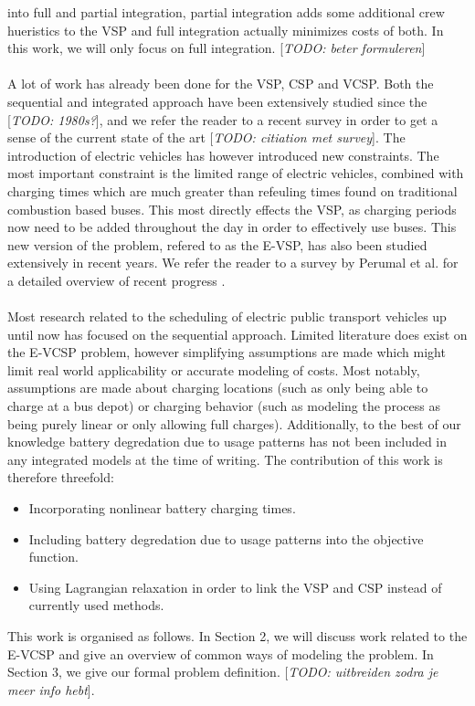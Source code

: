 \documentclass[]{article}
\newcommand{\todo}[1]{{\color{red}[\textit{TODO: #1}]}}
\begin{document}
into full and partial integration, partial integration adds some additional
crew hueristics to the VSP and full integration actually minimizes costs of
both. In this work, we will only focus on full integration. \todo{beter
  formuleren} \\\\ A lot of work has already been done for the VSP, CSP and VCSP.
Both the sequential and integrated approach have been extensively studied since
the \todo{1980s?}, and we refer the reader to a recent survey in order to get a
sense of the current state of the art \todo{citiation met survey}. The
introduction of electric vehicles has however introduced new constraints. The
most important constraint is the limited range of electric vehicles, combined
with charging times which are much greater than refeuling times found on
traditional combustion based buses. This most directly effects the VSP, as
charging periods now need to be added throughout the day in order to
effectively use buses. This new version of the problem, refered to as the
E-VSP, has also been studied extensively in recent years. We refer the reader
to a survey by Perumal et al. for a detailed overview of recent progress
\cite{Perumal2022LitRev}. \\\\ Most research related to the scheduling of
electric public transport vehicles up until now has focused on the sequential
approach. Limited literature does exist on the E-VCSP problem, however
simplifying assumptions are made which might limit real world applicability or
accurate modeling of costs. Most notably, assumptions are made about charging
locations (such as only being able to charge at a bus depot) or charging
behavior (such as modeling the process as being purely linear or only allowing
full charges). Additionally, to the best of our knowledge battery degredation
due to usage patterns has not been included in any integrated models at the
time of writing. The contribution of this work is therefore threefold:
\begin{itemize}
  \item Incorporating nonlinear battery charging times.
  \item Including battery degredation due to usage patterns into the objective
        function.
  \item Using Lagrangian relaxation in order to link the VSP and CSP instead of
        currently used methods.
\end{itemize}
This work is organised as follows. In Section 2, we will discuss work related to the E-VCSP and give an overview of common ways of modeling the problem. In Section 3, we give our formal problem definition. \todo{uitbreiden zodra je meer info hebt}.
\end{document}
